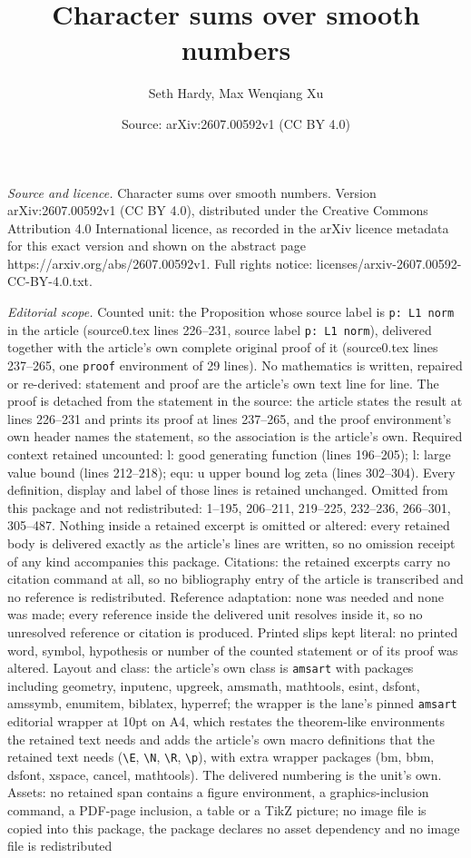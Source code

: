 \documentclass[10pt,a4paper]{amsart}
\title[Character sums over smooth numbers]{Character sums over smooth numbers}
\author{Seth Hardy, Max Wenqiang Xu}
\date{Source: arXiv:2607.00592v1 (CC BY 4.0)}
\begin{document}
\maketitle

\noindent\emph{Source and licence.} Character sums over smooth numbers. Version arXiv:2607.00592v1 (CC BY 4.0), distributed under the Creative Commons Attribution 4.0 International licence, as recorded in the arXiv licence metadata for this exact version and shown on the abstract page https://arxiv.org/abs/2607.00592v1. Full rights notice: licenses/arxiv-2607.00592-CC-BY-4.0.txt.\par\smallskip

\noindent\textit{Editorial scope.} Counted unit: the Proposition whose source label is \texttt{p: L1 norm} in the article (source0.tex lines 226--231, source label \texttt{p: L1 norm}), delivered together with the article's own complete original proof of it (source0.tex lines 237--265, one \texttt{proof} environment of 29 lines). No mathematics is written, repaired or re-derived: statement and proof are the article's own text line for line. The proof is detached from the statement in the source: the article states the result at lines 226--231 and prints its proof at lines 237--265, and the proof environment's own header names the statement, so the association is the article's own. Required context retained uncounted: l: good generating function (lines 196--205); l: large value bound (lines 212--218); equ: u upper bound log zeta (lines 302--304). Every definition, display and label of those lines is retained unchanged. Omitted from this package and not redistributed: 1--195, 206--211, 219--225, 232--236, 266--301, 305--487. Nothing inside a retained excerpt is omitted or altered: every retained body is delivered exactly as the article's lines are written, so no omission receipt of any kind accompanies this package. Citations: the retained excerpts carry no citation command at all, so no bibliography entry of the article is transcribed and no reference is redistributed. Reference adaptation: none was needed and none was made; every reference inside the delivered unit resolves inside it, so no unresolved reference or citation is produced. Printed slips kept literal: no printed word, symbol, hypothesis or number of the counted statement or of its proof was altered. Layout and class: the article's own class is \texttt{amsart} with packages including geometry, inputenc, upgreek, amsmath, mathtools, esint, dsfont, amssymb, enumitem, biblatex, hyperref; the wrapper is the lane's pinned \texttt{amsart} editorial wrapper at 10pt on A4, which restates the theorem-like environments the retained text needs and adds the article's own macro definitions that the retained text needs (\texttt{\textbackslash E}, \texttt{\textbackslash N}, \texttt{\textbackslash R}, \texttt{\textbackslash p}), with extra wrapper packages (bm, bbm, dsfont, xspace, cancel, mathtools). The delivered numbering is the unit's own. Assets: no retained span contains a figure environment, a graphics-inclusion command, a PDF-page inclusion, a table or a TikZ picture; no image file is copied into this package, the package declares no asset dependency and no image file is redistributed 
\end{document}
